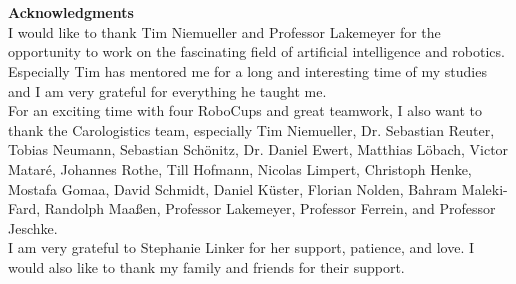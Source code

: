 \newpage

\section*{} 
\vspace{4cm}
\textbf{\noindent \Huge Acknowledgments}
\vspace{1cm}\\
\noindent
I would like to thank Tim Niemueller and Professor Lakemeyer for the
opportunity to work on the fascinating field of artificial
intelligence and robotics. Especially Tim has mentored me for a long
and interesting time of my studies and I am very grateful for
everything he taught me.\\ For an exciting time with four RoboCups and
great teamwork, I also want to thank the Carologistics team,
especially Tim Niemueller, Dr. Sebastian Reuter, Tobias Neumann,
Sebastian Schönitz, Dr. Daniel Ewert, Matthias Löbach, Victor
Matar\'{e}, Johannes Rothe, Till Hofmann, Nicolas Limpert, Christoph
Henke, Mostafa Gomaa, David Schmidt, Daniel Küster, Florian Nolden,
Bahram Maleki-Fard, Randolph Maaßen, Professor Lakemeyer, Professor
Ferrein, and Professor Jeschke.\\ I am very grateful to Stephanie
Linker for her support, patience, and love. I would also
like to thank my family and friends for their support.

